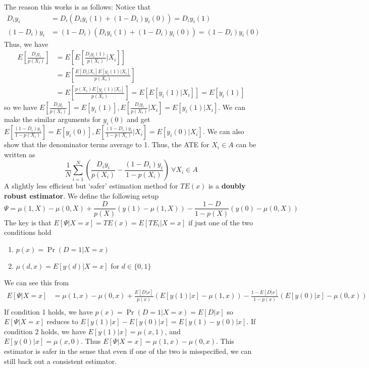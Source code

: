 \documentclass[12pt]{article}
\theoremstyle{definition}
\theoremstyle{property}
\theoremstyle{assumption}
\theoremstyle{example}
\theoremstyle{comment}
\begin{document}
The reason this works is as follows: Notice that
\begin{align*}
D_iy_i& = D_i(D_iy_i(1)+(1-D_i)y_i(0))=D_iy_i(1)\\
(1-D_i)y_i&=(1-D_i)(D_iy_i(1)+(1-D_i)y_i(0))=(1-D_i)y_i(0)
\end{align*}
Thus, we have
\begin{align*}
E\left[\frac{D_iy_i}{p(X_i)}\right]&=E\left[E\left[\frac{D_iy_i(1)}{p(X_i)}|X_i\right]\right]\\
&=E\left[\frac{E[D_i|X_i]E[y_i(1)|X_i]}{p(X_i)}\right]\\
&=E\left[\frac{p(X_i)E[y_i(1)|X_i]}{p(X_i)}\right]=E[E[y_i(1)|X_i]]=E[y_i(1)]
\end{align*}
so we have $E\left[\frac{D_iy_i}{p(X_i)}\right]=E[y_i(1)], E\left[\frac{D_iy_i}{p(X_i)}|X_i\right]=E[y_i(1)|X_i]$. We can make the similar arguments for $y_i(0)$ and get $E\left[\frac{(1-D_i)y_i}{1-p(X_i)}\right]=E[y_i(0)], E\left[\frac{(1-D_i)y_i}{1-p(X_i)}|X_i\right]=E[y_i(0)|X_i]$. We can also show that the denominator terms average to 1. Thus, the ATE for $X_i\in A$ can be written as
\[
\frac{1}{N}\sum_{i=1}^N\left(\frac{D_i y_i}{p(X_i)}-\frac{(1-D_i)y_i}{1-p(X_i)}\right) \ \forall X_i\in A
\]
A slightly less efficient but `safer' estimation method for $TE(x)$ is a \textbf{doubly robust estimator}. We define the following setup
\[
\Psi=\mu(1,X)-\mu(0,X)+\frac{D}{p(X)}(y(1)-\mu(1,X))-\frac{1-D}{1-p(X)}(y(0)-\mu(0,X))
\]
The key is that $E[\Psi|X=x]=TE(x)=E[TE_i|X=x]$ if just one of the two conditions hold
\begin{enumerate}
\item $p(x)=\Pr(D=1|X=x)$
\item $\mu(d,x)=E[y(d)|X=x]$ for $d\in\{0,1\}$
\end{enumerate}
We can see this from
\small{\[
\begin{aligned}
E[\Psi|X=x]&=\mu(1,x)-\mu(0,x)+\frac{E[D|x]}{p(x)}(E[y(1)|x]-\mu(1,x))-\frac{1-E[D|x]}{1-p(x)}(E[y(0)|x]-\mu(0,x))\\
\end{aligned}
\]}\normalsize
If condition 1 holds, we have $p(x)=\Pr(D=1|X=x)=E[D|x]$ so $E[\Psi|X=x]$ reduces to $E[y(1)|x]-E[y(0)|x]=E[y(1)-y(0)|x]$. If condition 2 holds, we have $E[y(1)|x]=\mu(x,1)$, and $E[y(0)|x]=\mu(x,0)$. Thus $E[\Psi|X=x]=\mu(1,x)-\mu(0,x)$. This estimator is safer in the sense that even if one of the two is misspecified, we can still back out a consistent estimator.
\end{document}
